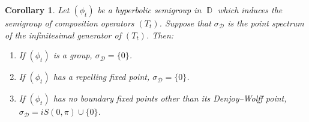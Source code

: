 \documentclass[11pt]{amsart}
\numberwithin{equation}{section}
\newtheorem{corollary}[theorem]{Corollary}
\theoremstyle{definition}
\DeclareMathOperator{\D}{\mathbb{D}}
\begin{document}
	\begin{corollary}\label{cor:hyperbolic dirichlet}
		Let $(\phi_t)$ be a hyperbolic semigroup in $\D$ which induces the semigroup of composition operators $(T_t)$. Suppose that $\sigma_\mathcal{D}$ is the point spectrum of the infinitesimal generator of $(T_t)$. Then:
		\begin{enumerate}
			\item[\textup{(a)}] If $(\phi_t)$ is a group, $\sigma_{\mathcal{D}}=\{0\}$.
			\item[\textup{(b)}] If $(\phi_t)$ has a repelling fixed point, $\sigma_{\mathcal{D}}=\{0\}$.
			\item[\textup{(c)}] If $(\phi_t)$ has no boundary fixed points other than its Denjoy--Wolff point, $\sigma_{\mathcal{D}}=iS(0,\pi)\cup\{0\}$.
		\end{enumerate}
	\end{corollary}
\end{document}
